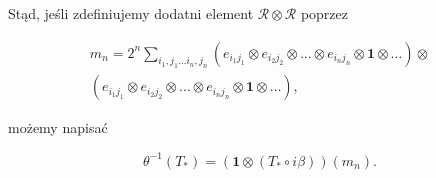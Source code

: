 Stąd, jeśli zdefiniujemy dodatni element $\mathcal{R}\otimes\mathcal{R}$ poprzez
\begin{linenomath*}
 \begin{multline}
m_{n} = 2^{n} \sum \limits_{i_{1}, j_{1}\ldots i_{n}, j_{n}}
\left( e_{i_{1} j_{1}} \otimes e_{i_{2} j_{2}} \otimes \ldots \otimes
e_{i_{n} j_{n}} \otimes \mathbf{1} \otimes \ldots \right) \otimes \\
\left( e_{i_{1} j_{1}} \otimes e_{i_{2} j_{2}}\otimes \ldots \otimes
e_{i_{n} j_{n}} \otimes \mathbf{1} \otimes \ldots\right),
 \end{multline}
\end{linenomath*}
możemy napisać
\begin{linenomath*}
 \begin{equation}
\label{eq:thetainverse}
\theta^{-1}(T_{*}) =(\mathbf{1} \otimes (T_{*} \circ i \beta)) (m_{n}).
 \end{equation}
\end{linenomath*}

